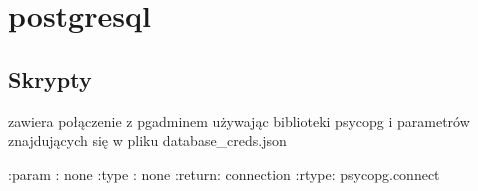 \documentclass[letterpaper,10pt,polish]{sphinxmanual}
\begin{document}
\section{postgresql}
\label{\detokenize{rozdzial4/index:postgresql}}

\subsection{Skrypty}
\label{\detokenize{rozdzial4/index:id1}}

\begin{fulllineitems}

\pysigstartsignatures
{}
\pysigstopsignatures
\sphinxAtStartPar
zawiera połączenie z pgadminem używając biblioteki psycopg i parametrów znajdujących się w pliku database\_creds.json

\sphinxAtStartPar
:param : none
:type : none
:return: connection
:rtype: psycopg.connect

\end{fulllineitems}
\end{document}
